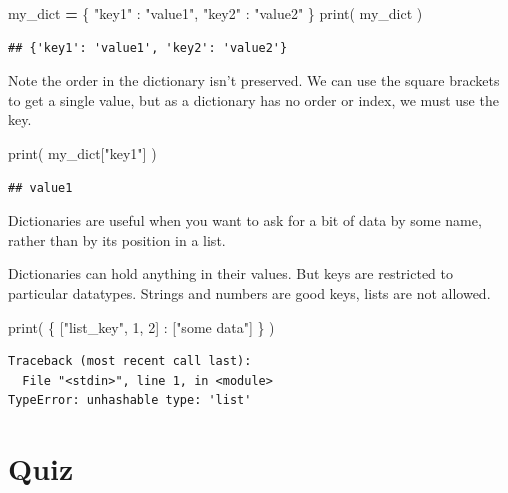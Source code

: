 \documentclass[]{book}
\newenvironment{Shaded}{\begin{snugshade}}{\end{snugshade}}
\newcommand{\BuiltInTok}[1]{#1}
\newcommand{\DecValTok}[1]{\textcolor[rgb]{0.00,0.00,0.81}{#1}}
\newcommand{\NormalTok}[1]{#1}
\newcommand{\OperatorTok}[1]{\textcolor[rgb]{0.81,0.36,0.00}{\textbf{#1}}}
\newcommand{\StringTok}[1]{\textcolor[rgb]{0.31,0.60,0.02}{#1}}
\theoremstyle{definition}
\theoremstyle{definition}
\theoremstyle{definition}
\theoremstyle{remark}
\begin{document}
\begin{Shaded}
\begin{Highlighting}[]
\NormalTok{my_dict }\OperatorTok{=}\NormalTok{ \{}
  \StringTok{"key1"}\NormalTok{ : }\StringTok{"value1"}\NormalTok{,}
  \StringTok{"key2"}\NormalTok{ : }\StringTok{"value2"}
\NormalTok{\}}
\BuiltInTok{print}\NormalTok{( my_dict )}
\end{Highlighting}
\end{Shaded}

\begin{verbatim}
## {'key1': 'value1', 'key2': 'value2'}
\end{verbatim}

Note the order in the dictionary isn't preserved. We can use the square
brackets to get a single value, but as a dictionary has no order or
index, we must use the key.

\begin{Shaded}
\begin{Highlighting}[]
\BuiltInTok{print}\NormalTok{( my_dict[}\StringTok{"key1"}\NormalTok{] )}
\end{Highlighting}
\end{Shaded}

\begin{verbatim}
## value1
\end{verbatim}

Dictionaries are useful when you want to ask for a bit of data by some
name, rather than by its position in a list.

Dictionaries can hold anything in their values. But keys are restricted
to particular datatypes. Strings and numbers are good keys, lists are
not allowed.

\begin{Shaded}
\begin{Highlighting}[]
\BuiltInTok{print}\NormalTok{( \{ [}\StringTok{"list_key"}\NormalTok{, }\DecValTok{1}\NormalTok{, }\DecValTok{2}\NormalTok{] : [}\StringTok{"some data"}\NormalTok{]  \} )}
\end{Highlighting}
\end{Shaded}

\begin{verbatim}
Traceback (most recent call last):
  File "<stdin>", line 1, in <module>
TypeError: unhashable type: 'list'
\end{verbatim}

\hypertarget{quiz-1}{%
\section{Quiz}\label{quiz-1}}
\end{document}
